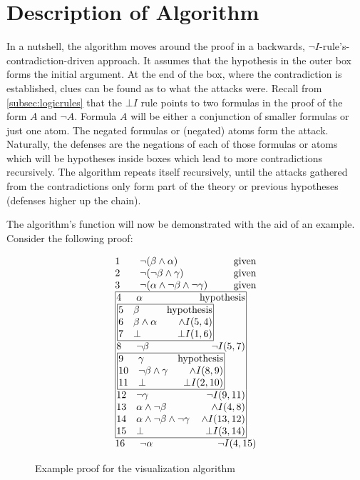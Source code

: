 \documentclass[11pt,twoside,a4paper]{report}
\begin{document}
\section{Description of Algorithm}
\label{sec:vizalg}
In a nutshell, the algorithm moves around the proof in a backwards, $\neg I$-rule's-contradiction-driven approach. It assumes that the hypothesis in the outer box forms the initial argument. At the end of the box, where the contradiction is established, clues can be found as to what the attacks were. Recall from \autoref{subsec:logicrules} that the $\bot I$ rule points to two formulas in the proof of the form $A$ and $\neg A$. Formula $A$ will be either a conjunction of smaller formulas or just one atom. The negated formulas or (negated) atoms form the attack. Naturally, the defenses are the negations of each of those formulas or atoms which will be hypotheses inside boxes which lead to more contradictions recursively. The algorithm repeats itself recursively, until the attacks gathered from the contradictions only form part of the theory or previous hypotheses (defenses higher up the chain).

The algorithm's function will now be demonstrated with the aid of an example. Consider 
the following proof:

\begin{figure}
\[\vbox{\offinterlineskip\halign{
&\tabskip=1.5em#\strut&$#$\hfil\tabskip=1em&\hfil$#$\tabskip=0em\cr
%
1&\neg(\beta\wedge\alpha)&\mbox{given}\cr
2&\neg(\neg\beta\wedge\gamma)&\mbox{given}\cr
3&\neg(\alpha\wedge\neg\beta\wedge\neg\gamma)&\mbox{given}\cr
%
\multispan3\vbox{\halign{
\vrule#&&\hskip.1em\tabskip=1em#\strut&$#$\hfil\tabskip=1em&\hfil$#$\hskip0.1em\tabskip=0em&\vrule#\cr
\noalign{\hrule}
%
&4&\alpha&\mbox{hypothesis}&\cr
%
&\multispan3\,\vbox{\halign{
\vrule#&&\hskip.1em\tabskip=1em#\strut&$#$\hfil\tabskip=1em&\hfil$#$\hskip0.1em\tabskip=0em&\vrule#\cr
\noalign{\hrule}
%
&5&\beta&\mbox{hypothesis}&\cr
&6&\beta\wedge\alpha&\wedge I(5,4)&\cr
&7&\bot&\bot I(1,6)&\cr
%
\noalign{\hrule}}}\,&\cr
%
&8&\neg\beta&\neg I(5,7)&\cr
%
&\multispan3\,\vbox{\halign{
\vrule#&&\hskip.1em\tabskip=1em#\strut&$#$\hfil\tabskip=1em&\hfil$#$\hskip0.1em\tabskip=0em&\vrule#\cr
\noalign{\hrule}
%
&9&\gamma&\mbox{hypothesis}&\cr
&10&\neg\beta\wedge\gamma&\wedge I(8,9)&\cr
&11&\bot&\bot I(2,10)&\cr
%
\noalign{\hrule}}}\,&\cr
%
&12&\neg\gamma&\neg I(9,11)&\cr
&13&\alpha\wedge\neg\beta&\wedge I(4,8)&\cr
&14&\alpha\wedge\neg\beta\wedge\neg\gamma&\wedge I(13,12)&\cr
&15&\bot&\bot I(3,14)&\cr
%
\noalign{\hrule}}}\,\cr
%
16&\neg\alpha&\neg I(4,15)\cr
}}\]
\caption{Example proof for the visualization algorithm\label{fig:vizexproof}}
\end{figure}
\end{document}
